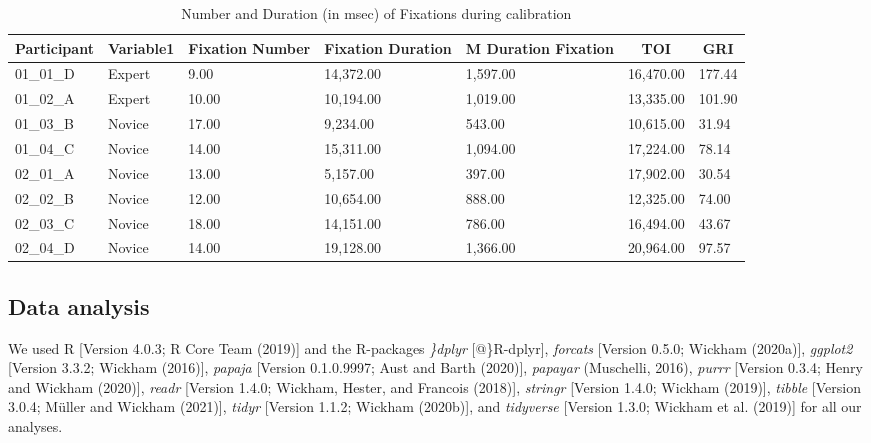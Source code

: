 \documentclass[
  english,
  man,floatsintext]{apa6}
\begin{document}
\begin{table}[h]

\begin{center}
\begin{threeparttable}

\caption{\label{tab:calibration phase TOI}Number and Duration (in msec) of Fixations during calibration}

\scriptsize{

\begin{tabular}{lllllll}
\toprule
Participant & \multicolumn{1}{c}{Variable1} & \multicolumn{1}{c}{Fixation Number} & \multicolumn{1}{c}{Fixation Duration} & \multicolumn{1}{c}{M Duration Fixation} & \multicolumn{1}{c}{TOI} & \multicolumn{1}{c}{GRI}\\
\midrule
01\_01\_D & Expert & 9.00 & 14,372.00 & 1,597.00 & 16,470.00 & 177.44\\
01\_02\_A & Expert & 10.00 & 10,194.00 & 1,019.00 & 13,335.00 & 101.90\\
01\_03\_B & Novice & 17.00 & 9,234.00 & 543.00 & 10,615.00 & 31.94\\
01\_04\_C & Novice & 14.00 & 15,311.00 & 1,094.00 & 17,224.00 & 78.14\\
02\_01\_A & Novice & 13.00 & 5,157.00 & 397.00 & 17,902.00 & 30.54\\
02\_02\_B & Novice & 12.00 & 10,654.00 & 888.00 & 12,325.00 & 74.00\\
02\_03\_C & Novice & 18.00 & 14,151.00 & 786.00 & 16,494.00 & 43.67\\
02\_04\_D & Novice & 14.00 & 19,128.00 & 1,366.00 & 20,964.00 & 97.57\\
\bottomrule
\end{tabular}

}

\end{threeparttable}
\end{center}

\end{table}

\hypertarget{data-analysis}{%
\subsection{Data analysis}\label{data-analysis}}

We used R {[}Version 4.0.3; R Core Team (2019){]} and the R-packages \emph{\}dplyr} {[}@\}R-dplyr{]}, \emph{forcats} {[}Version 0.5.0; Wickham (2020a){]}, \emph{ggplot2} {[}Version 3.3.2; Wickham (2016){]}, \emph{papaja} {[}Version 0.1.0.9997; Aust and Barth (2020){]}, \emph{papayar} (Muschelli, 2016), \emph{purrr} {[}Version 0.3.4; Henry and Wickham (2020){]}, \emph{readr} {[}Version 1.4.0; Wickham, Hester, and Francois (2018){]}, \emph{stringr} {[}Version 1.4.0; Wickham (2019){]}, \emph{tibble} {[}Version 3.0.4; Müller and Wickham (2021){]}, \emph{tidyr} {[}Version 1.1.2; Wickham (2020b){]}, and \emph{tidyverse} {[}Version 1.3.0; Wickham et al. (2019){]} for all our analyses.
\end{document}
